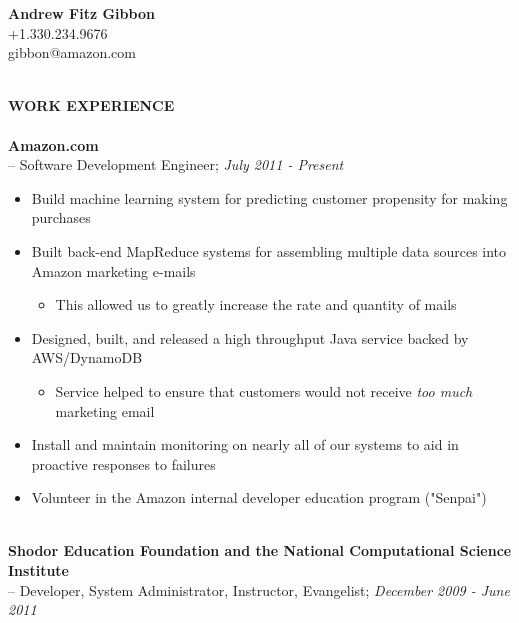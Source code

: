 \documentclass[10pt]{article}
\begin{document}
\begin{center}
\textbf{Andrew Fitz Gibbon}~\\
+1.330.234.9676~\\
gibbon@amazon.com~\\
\end{center}
~\\
\textbf{WORK EXPERIENCE}~\\
~\\
\indent\textbf{Amazon.com}~\\
\indent \indent -- Software Development Engineer; \textit{July 2011 - Present}
\begin{itemize}
  \addtolength{\itemsep}{-2mm}
    \item \indent Build machine learning system for predicting customer propensity for making purchases
		\item \indent Built back-end MapReduce systems for assembling multiple data sources into Amazon marketing e-mails
		\vspace{-2mm}
		\begin{itemize}
			\addtolength{\itemsep}{-2mm}
			\item This allowed us to greatly increase the rate and quantity of mails
		\end{itemize}
		\vspace{-2mm}
    \item \indent Designed, built, and released a high throughput Java service backed by AWS/DynamoDB
		\vspace{-2mm}
		\begin{itemize}
			\addtolength{\itemsep}{-2mm}
			\item Service helped to ensure that customers would not receive \textit{too much} marketing email
		\end{itemize}
		\vspace{-2mm}
    \item \indent Install and maintain monitoring on nearly all of our systems to aid in proactive responses to failures
    \item \indent Volunteer in the Amazon internal developer education program ("Senpai")
\end{itemize}
~\\
\indent\textbf{Shodor Education Foundation and the National Computational Science Institute}~\\
\indent \indent -- Developer, System Administrator, Instructor, Evangelist; \textit{December 2009 - June 2011}
\end{document}
